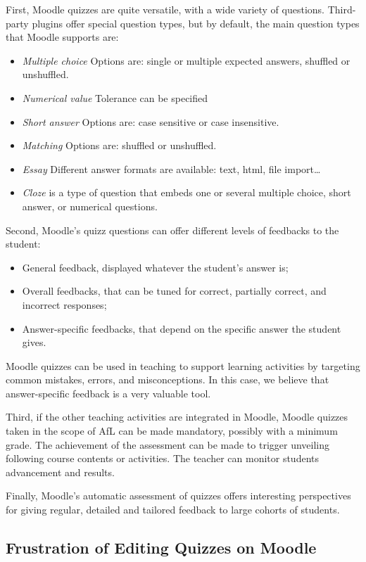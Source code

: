 \documentclass[twocolumn,a4paper,9pt]{article}
\begin{document}
First, Moodle quizzes are quite versatile, with a wide variety of questions. 
Third-party plugins offer special question types, but by default, the main 
question types that Moodle supports are:
\begin{itemize}
\item \emph{Multiple choice} Options are: single or multiple expected 
answers, shuffled or unshuffled.
\item \emph{Numerical value} Tolerance can be specified
\item \emph{Short answer} Options are: case sensitive or case insensitive.
\item \emph{Matching} Options are: shuffled or unshuffled.
\item \emph{Essay} Different answer formats are available: text, html, file 
import\dots
\item \emph{Cloze} is a type of question that embeds one or several multiple 
choice, short answer, or numerical questions.
\end{itemize}

Second, Moodle's quizz questions can offer different levels of feedbacks 
to the student:
\begin{itemize}
	\item General feedback, displayed whatever the student's answer is;
	\item Overall feedbacks, that can be tuned for correct, partially correct, 
	and incorrect responses;
	\item Answer-specific feedbacks, that depend on the specific answer the 
	student gives.
\end{itemize}
Moodle quizzes can be used in teaching to support learning activities by 
targeting common mistakes, errors, and misconceptions. In this case, we believe 
that answer-specific feedback is a very valuable tool.

Third, if the other teaching activities are integrated in Moodle, Moodle 
quizzes taken in the scope of AfL can be made mandatory, possibly with a 
minimum grade. The achievement of the assessment can be made to trigger 
unveiling following course contents or activities. The teacher can monitor 
students advancement and results.

Finally, Moodle's automatic assessment of quizzes offers interesting 
perspectives for giving regular, detailed and tailored feedback to large 
cohorts of students.

\subsection{Frustration of Editing Quizzes on Moodle}
\end{document}
